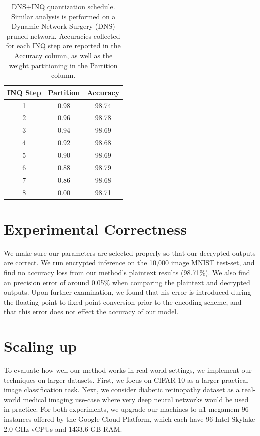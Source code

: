 \documentclass[conference]{IEEEtran}
\begin{document}
\begin{table}[!htbp]
    \centering
    \small
    \begin{tabular}{@{}c|c|c@{}}
    \toprule
    INQ Step & Partition  & Accuracy \\ \midrule
     1 & 0.98 &  98.74\\
    2 & 0.96 &  98.78\\ 
    3 & 0.94 &  98.69\\ 
    4 & 0.92 &  98.68\\ 
    5 & 0.90 &  98.69\\
    6 & 0.88 &  98.79\\ 
    7 & 0.86 &  98.68\\ 
    8 & 0.00 &  98.71 \\ 
     \bottomrule
    \end{tabular}
    \caption{DNS+INQ quantization schedule. Similar analysis is performed on a Dynamic Network Surgery (DNS) pruned network.  Accuracies collected for each INQ step are reported in the Accuracy column, as well as the weight partitioning in the Partition column.}
    \label{table:sup_quantize2}
\end{table}

\section{Experimental Correctness}
We make sure our parameters are selected properly so that our decrypted outputs are correct.  We run encrypted inference on the 10,000 image MNIST test-set, and find no accuracy loss from our method's plaintext results (98.71\%).  We also find an precision error of around 0.05\% when comparing the plaintext and decrypted outputs.  Upon further examination, we found that his error is introduced during the floating point to fixed point conversion prior to the encoding scheme, and that this error does not effect the accuracy of our model.   


\section{Scaling up}\label{sec:scaling up}
To evaluate how well our method works in real-world settings, we implement our techniques on larger datasets.  First, we focus on CIFAR-10 as a larger practical image classification task. Next, we consider diabetic retinopathy dataset as a real-world medical imaging use-case where very deep neural networks would be used in practice.
For both experiments, we upgrade our machines to n1-megamem-96 instances offered by the Google Cloud Platform, which each have 96 Intel Skylake 2.0 GHz vCPUs and 1433.6 GB RAM. 
\end{document}
